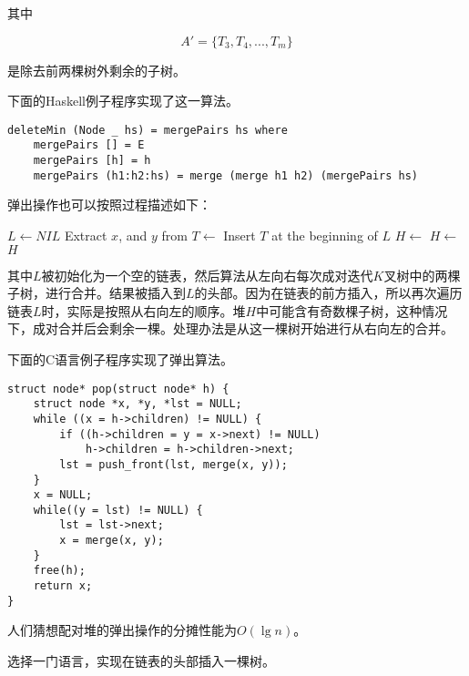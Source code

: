 \documentclass{ctexart}
\begin{document}
其中

\[
A' = \{ T_3, T_4, ..., T_m\}
\]

是除去前两棵树外剩余的子树。

下面的Haskell例子程序实现了这一算法。

\lstset{language=Haskell}
\begin{lstlisting}[style=Haskell]
deleteMin (Node _ hs) = mergePairs hs where
    mergePairs [] = E
    mergePairs [h] = h
    mergePairs (h1:h2:hs) = merge (merge h1 h2) (mergePairs hs)
\end{lstlisting}

弹出操作也可以按照过程描述如下：

\begin{algorithmic}[1]
  \State $L \gets NIL$
    \State Extract $x$, and $y$ from 
    \State $T \gets $ 
    \State Insert $T$ at the beginning of $L$
  \EndFor
  \State $H \gets $  
    \State $H \gets $ 
  \EndFor
  \State \Return $H$
\EndFunction
\end{algorithmic}

其中$L$被初始化为一个空的链表，然后算法从左向右每次成对迭代$K$叉树中的两棵子树，进行合并。结果被插入到$L$的头部。因为在链表的前方插入，所以再次遍历链表$L$时，实际是按照从右向左的顺序。堆$H$中可能含有奇数棵子树，这种情况下，成对合并后会剩余一棵。处理办法是从这一棵树开始进行从右向左的合并。

下面的C语言例子程序实现了弹出算法。

\lstset{language=C}
\begin{lstlisting}
struct node* pop(struct node* h) {
    struct node *x, *y, *lst = NULL;
    while ((x = h->children) != NULL) {
        if ((h->children = y = x->next) != NULL)
            h->children = h->children->next;
        lst = push_front(lst, merge(x, y));
    }
    x = NULL;
    while((y = lst) != NULL) {
        lst = lst->next;
        x = merge(x, y);
    }
    free(h);
    return x;
}
\end{lstlisting}

人们猜想配对堆的弹出操作的分摊性能为$O(\lg n)$\cite{pairing-heap}。

\begin{Exercise}
选择一门语言，实现在链表的头部插入一棵树。
\end{Exercise}
\end{document}
